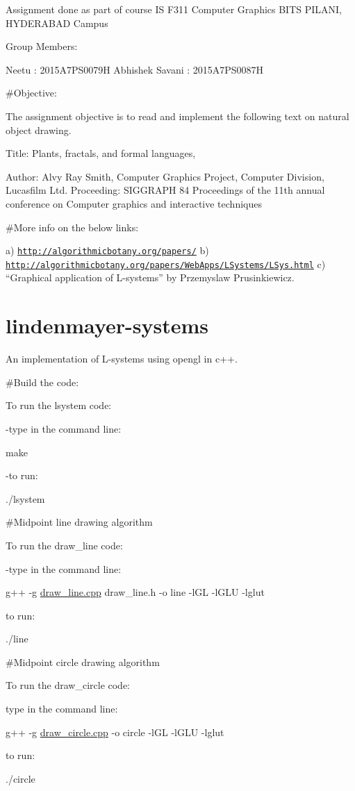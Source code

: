 Assignment done as part of course IS F311 Computer Graphics B\+I\+TS P\+I\+L\+A\+NI, H\+Y\+D\+E\+R\+A\+B\+AD Campus

Group Members\+:

Neetu \+: 2015\+A7\+P\+S0079H Abhishek Savani \+: 2015\+A7\+P\+S0087H

\#\+Objective\+:

The assignment objective is to read and implement the following text on natural object drawing.

Title\+: Plants, fractals, and formal languages,

Author\+: Alvy Ray Smith, Computer Graphics Project, Computer Division, Lucasfilm Ltd. Proceeding\+: S\+I\+G\+G\+R\+A\+PH \textquotesingle{}84 Proceedings of the 11th annual conference on Computer graphics and interactive techniques

\#\+More info on the below links\+:

a) \href{http://algorithmicbotany.org/papers/}{\tt http\+://algorithmicbotany.\+org/papers/} b) \href{http://algorithmicbotany.org/papers/WebApps/LSystems/LSys.html}{\tt http\+://algorithmicbotany.\+org/papers/\+Web\+Apps/\+L\+Systems/\+L\+Sys.\+html} c) “\+Graphical application of L-\/systems” by Przemyslaw Prusinkiewicz.

\section*{lindenmayer-\/systems}

An implementation of L-\/systems using opengl in c++.

\#\+Build the code\+:

To run the lsystem code\+:

-\/type in the command line\+:

make

-\/to run\+:

./lsystem

\#\+Midpoint line drawing algorithm

To run the draw\+\_\+line code\+:

-\/type in the command line\+:

g++ -\/g \hyperlink{draw__line_8cpp}{draw\+\_\+line.\+cpp} draw\+\_\+line.\+h -\/o line -\/l\+GL -\/l\+G\+LU -\/lglut


\begin{DoxyItemize}
\item to run\+:

./line
\end{DoxyItemize}

\#\+Midpoint circle drawing algorithm

To run the draw\+\_\+circle code\+:


\begin{DoxyItemize}
\item type in the command line\+:

g++ -\/g \hyperlink{draw__circle_8cpp}{draw\+\_\+circle.\+cpp} -\/o circle -\/l\+GL -\/l\+G\+LU -\/lglut
\item to run\+:

./circle 
\end{DoxyItemize}